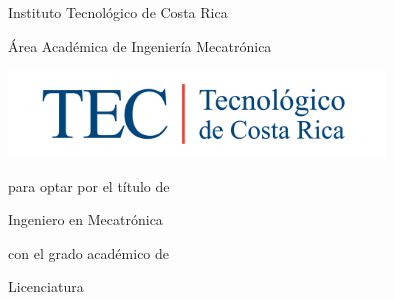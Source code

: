 
\thispagestyle{empty} 

\begin{center}

Instituto Tecnológico de Costa Rica

\par\vspace{1ex}

Área Académica de Ingeniería Mecatrónica

\par\vspace{20mm}

\includegraphics[width=100mm]{fig/MarcaTECRGB.png}

\par\vspace*{\fill}

{\large\bf{\scriptTitle}}

\par\vspace*{\fill}

para optar por el título de

Ingeniero en Mecatrónica 

con el grado académico de 

Licenciatura

\par\vspace{20mm}

\scriptAuthor

\vspace*{\fill}

\end{center}
\newpage 
\cleardoublepage 



